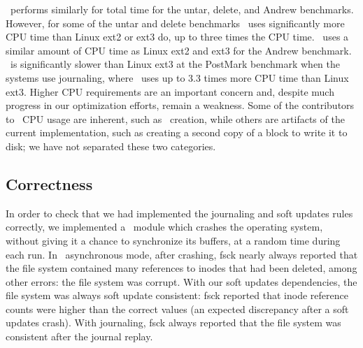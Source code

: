 \Kudos\ performs similarly for total time for the untar, delete, and
Andrew benchmarks. However, for some of the untar and delete
benchmarks \Kudos\ uses significantly more CPU time than Linux ext2 or
ext3 do, up to three times the CPU time. \Kudos\ uses a similar
amount of CPU time as Linux ext2 and ext3 for the Andrew benchmark.
%
\Kudos\ is significantly slower than Linux ext3 at the PostMark
benchmark when the systems use journaling, where \Kudos\ uses up to
3.3 times more CPU time than Linux ext3.
%
Higher CPU requirements are an important concern and, despite much progress
in our optimization efforts, remain a weakness.
%
Some of the contributors to \Kudos\ CPU usage are inherent, such as
\patch\ creation, while others are artifacts of the current
implementation, such as creating a second copy of a block to write it to
disk; we have not separated these two categories.
%
%
\begin{comment}
Further, while \Kudos\ I/O times are lower than Linux ext2/ext3 I/O
times for the untar and delete benchmarks, we have found that small
block allocation strategy changes can significantly affect I/O time
for many of these benchmarks. This further emphasizes the importance
of the system CPU time difference.
\end{comment}

\begin{comment}
Unlike the untar, delete, and Andrew benchmarks, Linux ext3 writeback
and journal modes outperform \Kudos\ meta journal and full journal
modes, respectively, at PostMark.
\end{comment}


\subsection {Correctness}
\label{sec:eval:correctness}

In order to check that we had implemented the journaling and soft updates
rules correctly,
we implemented a \Kudos\ module which crashes the operating system, without
giving it a chance to synchronize its buffers, at a random time during each
run.
%
In \Kudos\ asynchronous mode, after crashing, fsck nearly always reported
that the file system contained many references to inodes that had been
deleted, among other errors: the file system was corrupt.
%
With our soft updates dependencies, the file system was always soft update
consistent: fsck reported that inode reference counts were higher than the
correct values (an expected discrepancy after a soft updates crash).
%
With journaling, fsck always reported that the file system was
consistent after the journal replay.

